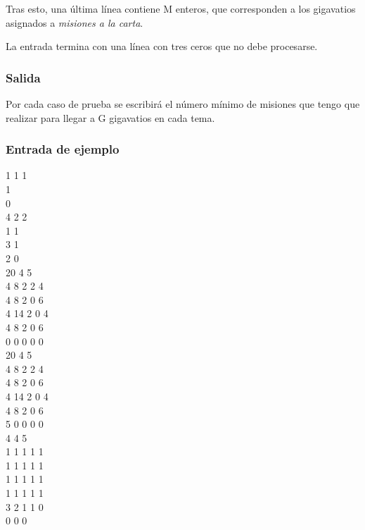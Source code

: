 \documentclass{article}
\newenvironment{caja}{
	\begingroup
	\ttfamily\noindent
	\tabularx{\linewidth}{|X|}\hline
}
{
	\hline\endtabularx
	\normalfont
	\endgroup
}
\begin{document}
	Tras esto, una última línea contiene M enteros, que corresponden a los gigavatios asignados a \textit{misiones a la carta}.
	
	La entrada termina con una línea con tres ceros que no debe procesarse.\\
	
	\subsubsection*{Salida}
	Por cada caso de prueba se escribirá el número mínimo de misiones que tengo que realizar para llegar a G gigavatios en cada tema.\\
	
	\subsubsection*{Entrada de ejemplo}
	\begin{caja}
		1 1 1\\
		1\\
		0\\
		4 2 2\\
		1 1\\
		3 1\\
		2 0\\
		20 4 5\\
		4 8 2 2 4\\
		4 8 2 0 6\\
		4 14 2 0 4\\
		4 8 2 0 6\\
		0 0 0 0 0\\
		20 4 5\\
		4 8 2 2 4\\
		4 8 2 0 6\\
		4 14 2 0 4\\
		4 8 2 0 6\\
		5 0 0 0 0\\
		4 4 5\\
		1 1 1 1 1\\
		1 1 1 1 1\\
		1 1 1 1 1\\
		1 1 1 1 1\\
		3 2 1 1 0\\
		0 0 0\\
	\end{caja}\\
	
\end{document}
